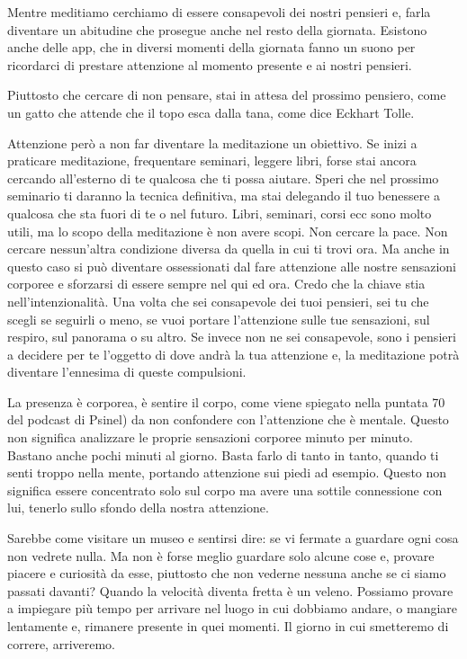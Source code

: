 \documentclass[12pt]{book} %
\begin{document}
Mentre meditiamo cerchiamo di
essere consapevoli dei nostri pensieri e, farla diventare un abitudine che prosegue anche nel resto della giornata.
Esistono anche delle app, che in diversi momenti della giornata fanno un suono per ricordarci di prestare
attenzione al momento presente e ai nostri pensieri. 

Piuttosto che cercare di non pensare, stai in attesa del prossimo pensiero, come un gatto che attende che il topo esca dalla tana, come dice Eckhart Tolle.

Attenzione però a non far diventare la meditazione un obiettivo. Se inizi a praticare meditazione, frequentare seminari,
leggere libri, forse stai ancora cercando all'esterno di te qualcosa che ti
possa aiutare. Speri che nel prossimo seminario ti daranno la tecnica definitiva, ma stai delegando il tuo benessere a
qualcosa che sta fuori di te o nel futuro. Libri, seminari, corsi ecc sono molto utili, ma lo
scopo della meditazione è non avere scopi. Non cercare la pace. Non cercare nessun'altra
condizione diversa da quella in cui ti trovi ora. Ma anche in questo caso si può diventare ossessionati dal fare
attenzione alle nostre sensazioni corporee e sforzarsi di essere sempre nel qui ed ora. 
Credo che la chiave stia nell'intenzionalità. Una volta che sei
consapevole dei tuoi pensieri, sei tu che scegli se seguirli o meno, se vuoi portare l'attenzione
sulle tue sensazioni, sul respiro, sul panorama o su altro. Se invece non ne sei consapevole, sono i pensieri a
decidere per te l'oggetto di dove andrà la tua attenzione e, la meditazione potrà diventare l'ennesima di queste compulsioni.

La presenza è corporea, è sentire il corpo, come viene spiegato nella puntata
70 del podcast di Psinel) da non confondere con l'attenzione che è mentale. Questo non significa analizzare le proprie sensazioni corporee minuto
per minuto. Bastano anche pochi minuti al giorno. Basta farlo di tanto in tanto, quando ti senti troppo nella mente,
portando attenzione sui piedi ad esempio. Questo non significa essere concentrato solo sul corpo ma
avere una sottile connessione con lui, tenerlo sullo sfondo della nostra attenzione.

Sarebbe come visitare un museo e sentirsi dire: se vi fermate a guardare ogni cosa non vedrete nulla. Ma non è forse
meglio guardare solo alcune cose e, provare piacere e curiosità da esse, piuttosto che non vederne nessuna anche se ci
siamo passati davanti? Quando la velocità diventa fretta è un veleno. Possiamo provare a impiegare più tempo per
arrivare nel luogo in cui dobbiamo andare, o mangiare lentamente e, rimanere presente in quei momenti. Il giorno in cui
smetteremo di correre, arriveremo.
\end{document}
